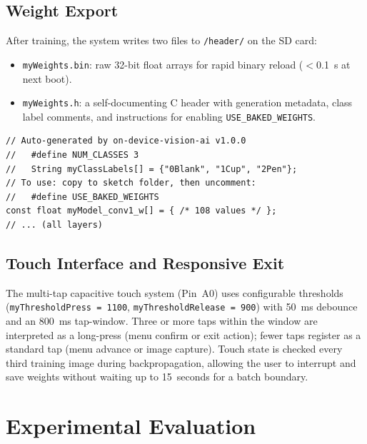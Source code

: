 \documentclass[12pt]{article}
\begin{document}
\subsection{Weight Export}
\label{subsec:export}

After training, the system writes two files to \texttt{/header/} on the SD card:

\begin{itemize}[nosep]
  \item \texttt{myWeights.bin}: raw 32-bit float arrays for rapid binary
        reload ($<$0.1~s at next boot).
  \item \texttt{myWeights.h}: a self-documenting C header with generation
        metadata, class label comments, and instructions for enabling
        \texttt{USE\_BAKED\_WEIGHTS}.
\end{itemize}

\begin{lstlisting}[caption={Fragment of exported myWeights.h.}]
// Auto-generated by on-device-vision-ai v1.0.0
//   #define NUM_CLASSES 3
//   String myClassLabels[] = {"0Blank", "1Cup", "2Pen"};
// To use: copy to sketch folder, then uncomment:
//   #define USE_BAKED_WEIGHTS
const float myModel_conv1_w[] = { /* 108 values */ };
// ... (all layers)
\end{lstlisting}

\subsection{Touch Interface and Responsive Exit}
\label{subsec:touch}

The multi-tap capacitive touch system (Pin~A0) uses configurable thresholds
(\texttt{myThresholdPress = 1100}, \texttt{myThresholdRelease = 900}) with
50~ms debounce and an 800~ms tap-window.
Three or more taps within the window are interpreted as a long-press (menu
confirm or exit action);
fewer taps register as a standard tap (menu advance or image capture).
Touch state is checked every third training image during backpropagation,
allowing the user to interrupt and save weights without waiting up to
15~seconds for a batch boundary.

\section{Experimental Evaluation}
\label{sec:evaluation}
\end{document}
